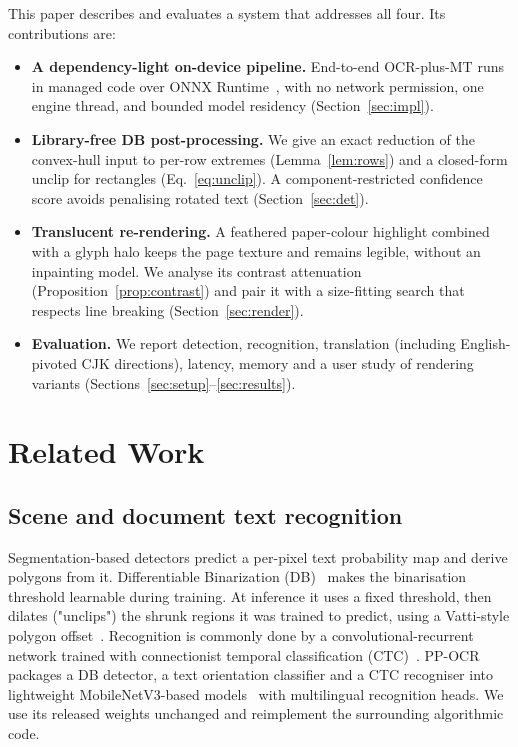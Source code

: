 \documentclass[journal]{IEEEtran}
\newif\ifdraft
\theoremstyle{definition}
\begin{document}
This paper describes and evaluates a system that addresses all four. Its
contributions are:
\begin{itemize}
  \item \textbf{A dependency-light on-device pipeline.} End-to-end
  OCR-plus-MT runs in managed code over ONNX Runtime~\cite{onnxruntime}, with
  no network permission, one engine thread, and bounded model residency
  (Section~\ref{sec:impl}).
  \item \textbf{Library-free DB post-processing.} We give an exact reduction
  of the convex-hull input to per-row extremes (Lemma~\ref{lem:rows}) and a
  closed-form unclip for rectangles (Eq.~\ref{eq:unclip}). A component-restricted
  confidence score avoids penalising rotated text (Section~\ref{sec:det}).
  \item \textbf{Translucent re-rendering.} A feathered paper-colour highlight
  combined with a glyph halo keeps the page texture and remains legible,
  without an inpainting model. We analyse its contrast attenuation
  (Proposition~\ref{prop:contrast}) and pair it with a size-fitting search
  that respects line breaking (Section~\ref{sec:render}).
  \item \textbf{Evaluation.} We report detection, recognition, translation
  (including English-pivoted CJK directions), latency, memory and a user study
  of rendering variants (Sections~\ref{sec:setup}--\ref{sec:results}).
\end{itemize}

\ifdraft
\noindent\textcolor{red}{\textbf{Draft status.} Sections~I--V are complete.
Sections~VI--VII give the experimental protocol and empty result tables;
no reported number is yet a measurement.}
\fi

\section{Related Work}

\subsection{Scene and document text recognition}
Segmentation-based detectors predict a per-pixel text probability map and
derive polygons from it. Differentiable Binarization (DB)~\cite{liao2020db}
makes the binarisation threshold learnable during training. At inference it
uses a fixed threshold, then dilates ("unclips") the shrunk regions it was
trained to predict, using a Vatti-style polygon offset~\cite{vatti1992clip}.
Recognition is commonly done by a convolutional-recurrent network trained with
connectionist temporal classification (CTC)~\cite{shi2017crnn,graves2006ctc}.
PP-OCR~\cite{du2020ppocr,li2022ppocrv3} packages a DB detector, a text
orientation classifier and a CTC recogniser into lightweight
MobileNetV3-based models~\cite{howard2019mobilenetv3} with multilingual
recognition heads. We use its released weights unchanged and reimplement the
surrounding algorithmic code.
\end{document}
